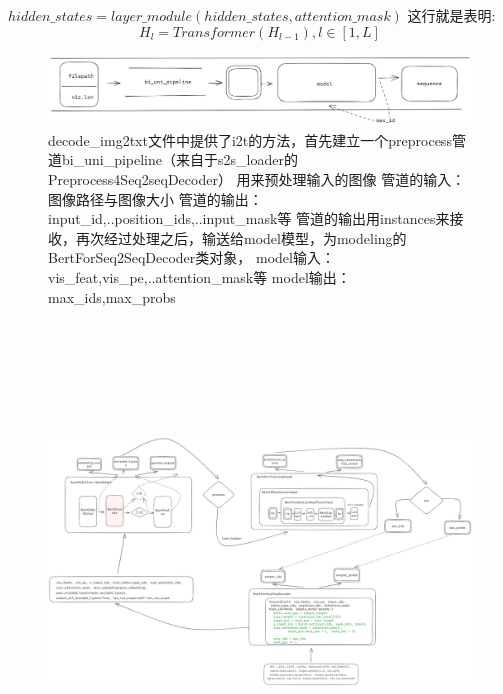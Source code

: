 \documentclass[a4paper]{article}
\begin{document}
\begin{sloppypar}
    $hidden\_states = layer\_module(hidden\_states, attention\_mask)$ 这行就是表明:
    $$
        H_l = Transformer(H_{l - 1}),l \in [1,L]
    $$


    \begin{figure}[H]
        \centering
        \includegraphics[scale=0.5]{ProcDecoder.png}

        \caption{decode\_img2txt文件中提供了i2t的方法，首先建立一个preprocess管道bi\_uni\_pipeline（来自于s2s\_loader的Preprocess4Seq2seqDecoder）
            用来预处理输入的图像
            管道的输入：图像路径与图像大小
            管道的输出：input\_id,..position\_ids,..input\_mask等
            管道的输出用instances来接收，再次经过处理之后，输送给model模型，为modeling的BertForSeq2SeqDecoder类对象，
            model输入：vis\_feat,vis\_pe,..attention\_mask等
            model输出：max\_ids,max\_probs
        }

        \label{ProcDecoder}
    \end{figure}


    \begin{figure}[H]
        \centering
        \includegraphics[width=6.5in,height=5.0in]{Bert4S2SDecoder.png}


\end{figure}
\end{sloppypar}
\end{document}
